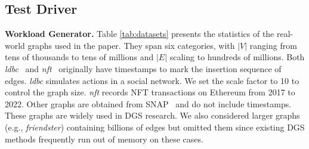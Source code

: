 \subsection{Test Driver}

\vspace{2pt}
\noindent\textbf{Workload Generator.} Table \ref{tab:datasets} presents the statistics of the real-world graphs used in the paper. They span six categories, with $|V|$ ranging from tens of thousands to tens of millions and $|E|$ scaling to hundreds of millions.  Both \emph{ldbc}~\cite{ldbcic} and \emph{nft}~\cite{Zhang2023LiveGL, livegraphlab} originally have timestamps to mark the insertion sequence of edges. \emph{ldbc} simulates actions in a social network. We set the scale factor to 10 to control the graph size. \emph{nft} records NFT transactions on Ethereum from 2017 to 2022. Other graphs are obtained from SNAP~\cite{snapnets} and do not include timestamps. These graphs are widely used in DGS research. We also considered larger graphs (e.g., \emph{friendster}) containing billions of edges but omitted them since existing DGS methods frequently run out of memory on these cases.
\small
